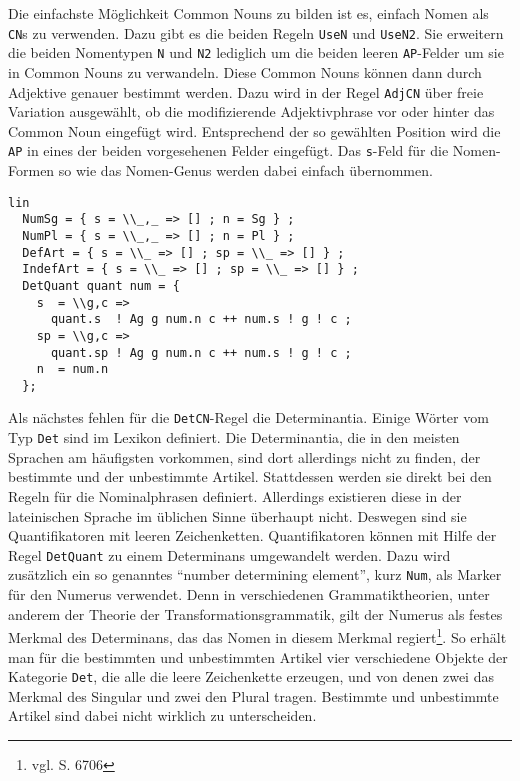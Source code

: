 Die einfachste Möglichkeit Common Nouns zu bilden ist es, einfach Nomen als \texttt{CN}s zu verwenden. Dazu gibt es die beiden Regeln \texttt{UseN} und \texttt{UseN2}. Sie erweitern die beiden Nomentypen \texttt{N} und \texttt{N2} lediglich um die beiden leeren \texttt{AP}-Felder um sie in Common Nouns zu verwandeln. Diese Common Nouns können dann durch Adjektive genauer bestimmt werden. Dazu wird in der Regel \texttt{AdjCN} über freie Variation ausgewählt, ob die modifizierende Adjektivphrase vor oder hinter das Common Noun eingefügt wird. Entsprechend der so gewählten Position wird die \texttt{AP} in eines der beiden vorgesehenen Felder eingefügt. Das \texttt{s}-Feld für die Nomen-Formen so wie das Nomen-Genus werden dabei einfach übernommen. \par
\begin{lstlisting}[float=h!tp,caption={Die Syntaxregeln \texttt{DetQuant} um aus einem \texttt{Num}-Element und einem Quantifikator ein \texttt{Det} zu erzeugen (vgl. \textbf{NounLat.gf}},label={GF-Noun-DetQuant}]
lin
  NumSg = { s = \\_,_ => [] ; n = Sg } ;
  NumPl = { s = \\_,_ => [] ; n = Pl } ;
  DefArt = { s = \\_ => [] ; sp = \\_ => [] } ;
  IndefArt = { s = \\_ => [] ; sp = \\_ => [] } ;
  DetQuant quant num = {
    s  = \\g,c => 
      quant.s  ! Ag g num.n c ++ num.s ! g ! c ;
    sp = \\g,c => 
      quant.sp ! Ag g num.n c ++ num.s ! g ! c ;
    n  = num.n
  };
\end{lstlisting}
Als nächstes fehlen für die \texttt{DetCN}-Regel die Determinantia. Einige Wörter vom Typ \texttt{Det} sind im Lexikon definiert. Die Determinantia, die in den meisten Sprachen am häufigsten vorkommen, sind dort allerdings nicht zu finden, der bestimmte und der unbestimmte Artikel. Stattdessen werden sie direkt bei den Regeln für die Nominalphrasen definiert. Allerdings existieren diese in der lateinischen Sprache im üblichen Sinne überhaupt nicht. Deswegen sind sie Quantifikatoren mit leeren Zeichenketten. Quantifikatoren können mit Hilfe der Regel \texttt{DetQuant} zu einem Determinans umgewandelt werden. Dazu wird zusätzlich ein so genanntes "`number determining element"', kurz \texttt{Num}, als Marker für den Numerus verwendet. Denn in verschiedenen Grammatiktheorien, unter anderem der Theorie der Transformationsgrammatik, gilt der Numerus als festes Merkmal des Determinans, das das Nomen in diesem Merkmal regiert\footnote{vgl. \cite{METZLER2004} S. 6706}. So erhält man für die bestimmten und unbestimmten Artikel vier verschiedene Objekte der Kategorie \texttt{Det}, die alle die leere Zeichenkette erzeugen, und von denen zwei das Merkmal des Singular und zwei den Plural tragen. Bestimmte und unbestimmte Artikel sind dabei nicht wirklich zu unterscheiden. \par
